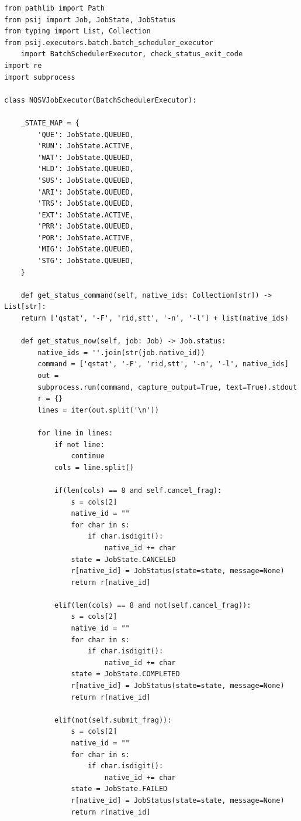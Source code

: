 \begin{lstlisting}[caption=ジョブの状態取得メソッド, label=get_status_now]
from pathlib import Path
from psij import Job, JobState, JobStatus
from typing import List, Collection 
from psij.executors.batch.batch_scheduler_executor 
    import BatchSchedulerExecutor, check_status_exit_code
import re
import subprocess

class NQSVJobExecutor(BatchSchedulerExecutor):

    _STATE_MAP = {
        'QUE': JobState.QUEUED,
        'RUN': JobState.ACTIVE,
        'WAT': JobState.QUEUED,
        'HLD': JobState.QUEUED,
        'SUS': JobState.QUEUED,
        'ARI': JobState.QUEUED,
        'TRS': JobState.QUEUED,
        'EXT': JobState.ACTIVE,
        'PRR': JobState.QUEUED,
        'POR': JobState.ACTIVE,
        'MIG': JobState.QUEUED,
        'STG': JobState.QUEUED, 
    }

    def get_status_command(self, native_ids: Collection[str]) -> List[str]:
    return ['qstat', '-F', 'rid,stt', '-n', '-l'] + list(native_ids) 

    def get_status_now(self, job: Job) -> Job.status:
        native_ids = ''.join(str(job.native_id))
        command = ['qstat', '-F', 'rid,stt', '-n', '-l', native_ids]
        out = 
        subprocess.run(command, capture_output=True, text=True).stdout
        r = {}
        lines = iter(out.split('\n'))

        for line in lines:
            if not line:
                continue
            cols = line.split()

            if(len(cols) == 8 and self.cancel_frag):
                s = cols[2]
                native_id = ""
                for char in s:
                    if char.isdigit():
                        native_id += char
                state = JobState.CANCELED
                r[native_id] = JobStatus(state=state, message=None)
                return r[native_id]
            
            elif(len(cols) == 8 and not(self.cancel_frag)):
                s = cols[2]
                native_id = ""
                for char in s:
                    if char.isdigit():
                        native_id += char
                state = JobState.COMPLETED
                r[native_id] = JobStatus(state=state, message=None)
                return r[native_id]

            elif(not(self.submit_frag)):
                s = cols[2]
                native_id = ""
                for char in s:
                    if char.isdigit():
                        native_id += char
                state = JobState.FAILED
                r[native_id] = JobStatus(state=state, message=None)
                return r[native_id]
            

\end{lstlisting}

